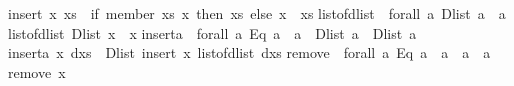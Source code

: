 \begin{isabellebody}
\begin{isamarkuptext}
insert\ x\ xs\ {}\ {}if\ member\ xs\ x\ then\ xs\ else\ x\ {}\ xs{}{}\isanewline
\isanewline
list{}of{}dlist\ {}{}\ forall\ a{}\ Dlist\ a\ {}{}\ {}a{}{}\isanewline
list{}of{}dlist\ {}Dlist\ x{}\ {}\ x{}\isanewline
\isanewline
inserta\ {}{}\ forall\ a{}\ {}Eq\ a{}\ {}{}\ a\ {}{}\ Dlist\ a\ {}{}\ Dlist\ a{}\isanewline
inserta\ x\ dxs\ {}\ Dlist\ {}insert\ x\ {}list{}of{}dlist\ dxs{}{}{}\isanewline
\isanewline
remove{}\ {}{}\ forall\ a{}\ {}Eq\ a{}\ {}{}\ a\ {}{}\ {}a{}\ {}{}\ {}a{}{}\isanewline
remove{}\ x\ {}{}\ {}\ {}{}{}\isanewline

\end{isamarkuptext}
\end{isabellebody}
